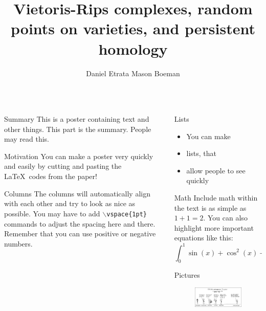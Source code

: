 \documentclass{beamer}
\title{Vietoris-Rips complexes, random points on varieties, and persistent homology}
\author{Daniel Etrata \quad Mason Boeman}
\institute{Mentors: Benjamin Antieau and J\={a}nis Lazovskis}
\begin{document}
\begin{frame}{}
\begin{columns}[t]

\begin{column}{0.32\linewidth}

\begin{block}{Summary}
This is a poster containing text and other things. This part is the summary. People may read this.
\end{block}

\begin{block}{Motivation}
You can make a poster very quickly and easily by cutting and pasting the \LaTeX\ codes from the paper!
\end{block}

\begin{block}{Columns}
The columns will automatically align with each other and try to look as nice as possible.
You may have to add {\tt$\backslash$vspace\{1pt\}} commands to adjust the spacing here and
there.  Remember that you can use positive or negative numbers.
\end{block}

\end{column}%

\begin{column}{0.32\linewidth}

\begin{block}{Lists}
\begin{itemize}
\item You can make
\item lists, that
\item allow people to see quickly
\end{itemize}
\end{block}

\begin{block}{Math}
Include math within the text is as simple as $1+1=2$. You can also highlight more important equations like this:
\[
\int_0^1\sin(x)+\cos^2(x)+\alpha x\ dx
\]
\end{block}

\begin{block}{Pictures}
\begin{figure}[htb]
\centering
\includegraphics[width=.6\columnwidth]{science}
\end{figure}
\end{block}


\end{column}
\end{columns}
\end{frame}
\end{document}

